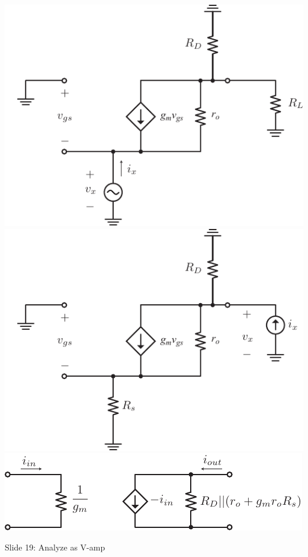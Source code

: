 \includegraphics[width=.75\columnwidth]{cgamp_is_ac_ss_zin}
\includegraphics[width=.75\columnwidth]{cgamp_is_ac_ss_rout}
\includegraphics[width=.75\columnwidth]{cg_model}

Slide 19:  Analyze as V-amp

